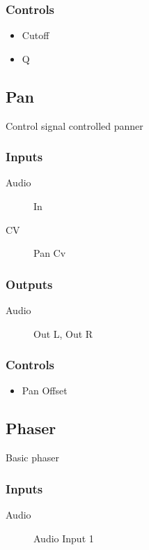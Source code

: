\subsubsection{Controls}
\begin{itemize}
\item Cutoff
\item Q
\end{itemize}

\subsection{Pan}

Control signal controlled panner



\subsubsection{Inputs}
\begin{description}
\item [Audio] In
\item [CV] Pan Cv
\end{description}

\subsubsection{Outputs}
\begin{description}
\item [Audio] Out L, Out R
\end{description}

\subsubsection{Controls}
\begin{itemize}
\item Pan Offset
\end{itemize}

\subsection{Phaser}

Basic phaser



\subsubsection{Inputs}
\begin{description}
\item [Audio] Audio Input 1
\end{description}

